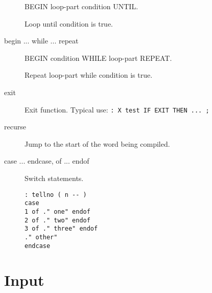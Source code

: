 \begin{description}
BEGIN loop-part condition UNTIL.

Loop until condition is true.

\item[\index{while}\index{repeat}begin ... while ... repeat]

BEGIN condition WHILE loop-part REPEAT.

Repeat loop-part while condition is true.

\item[\index{exit}exit]

Exit function. Typical use: \texttt{: X test IF EXIT THEN ... ;}

\item[\index{recurse}recurse] Jump to the start of the word being compiled.

\item[\index{case}\index{endcase}case ... endcase, \index{of}of ... \index{endof}endof] Switch statements.

\begin{verbatim}
: tellno ( n -- )
case
1 of ." one" endof
2 of ." two" endof
3 of ." three" endof
." other"
endcase
\end{verbatim}

\end{description}

\section{Input}

